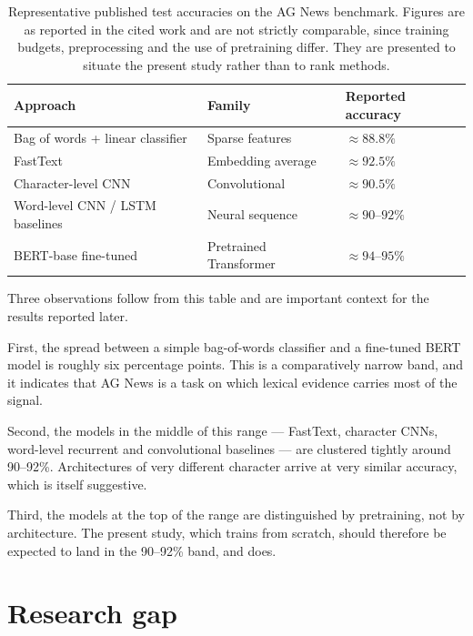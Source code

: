 \begin{table}[ht]
\centering
\caption[Representative published results on AG News]{Representative published test accuracies on
the AG News benchmark. Figures are as reported in the cited work and are not strictly comparable,
since training budgets, preprocessing and the use of pretraining differ. They are presented to
situate the present study rather than to rank methods.}
\label{tab:prior}
\begin{tabular}{lll}
\toprule
\textbf{Approach} & \textbf{Family} & \textbf{Reported accuracy} \\
\midrule
Bag of words + linear classifier \cite{zhang2015}   & Sparse features   & $\approx 88.8\%$ \\
FastText \cite{joulin2017}                          & Embedding average & $\approx 92.5\%$ \\
Character-level CNN \cite{zhang2015}                & Convolutional     & $\approx 90.5\%$ \\
Word-level CNN / LSTM baselines \cite{zhang2015}    & Neural sequence   & $\approx 90$--$92\%$ \\
BERT-base fine-tuned \cite{devlin2019,liu2019}      & Pretrained Transformer & $\approx 94$--$95\%$ \\
\bottomrule
\end{tabular}
\end{table}

Three observations follow from this table and are important context for the results reported later.

First, the spread between a simple bag-of-words classifier and a fine-tuned BERT model is roughly
six percentage points. This is a comparatively narrow band, and it indicates that AG News is a
task on which lexical evidence carries most of the signal.

Second, the models in the middle of this range --- FastText, character CNNs, word-level recurrent
and convolutional baselines --- are clustered tightly around 90--92\%. Architectures of very
different character arrive at very similar accuracy, which is itself suggestive.

Third, the models at the top of the range are distinguished by pretraining, not by architecture.
The present study, which trains from scratch, should therefore be expected to land in the 90--92\%
band, and does.

\section{Research gap}

